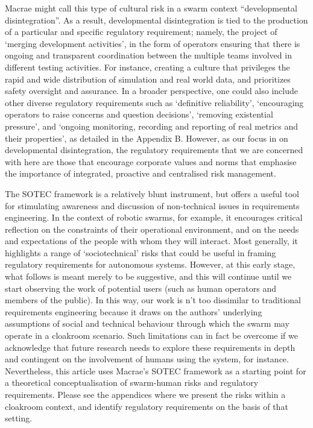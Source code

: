 \documentclass[lettersize,journal]{IEEEtran}
\begin{document}
Macrae \cite{macrae2021learning} might call this type of cultural risk in a swarm context ``developmental disintegration”. As a result, developmental disintegration is tied to the production of a particular and specific regulatory requirement; namely, the project of `merging development activities’, in the form of operators ensuring that there is ongoing and transparent coordination between the multiple teams involved in different testing activities. For instance, creating a culture that privileges the rapid and wide distribution of simulation and real world data, and prioritizes safety oversight and assurance. In a broader perspective, one could also include other diverse regulatory requirements such as `definitive reliability’, `encouraging operators to raise concerns and question decisions’, `removing existential pressure’, and `ongoing monitoring, recording and reporting of real metrics and their properties’, as detailed in the Appendix B. However, as our focus in on developmental disintegration, the regulatory requirements that we are concerned with here are those that encourage corporate values and norms that emphasise the importance of integrated, proactive and centralised risk management.

The SOTEC framework is a relatively blunt instrument, but offers a useful tool for stimulating awareness and discussion of non-technical issues in requirements engineering. In the context of robotic swarms, for example, it encourages critical reflection on the constraints of their operational environment, and on the needs and expectations of the people with whom they will interact. Most generally, it highlights a range of `sociotechnical’ risks that could be useful in framing regulatory requirements for autonomous systems. However, at this early stage, what follows is meant merely to be suggestive, and this will continue until we start observing the work of potential users (such as human operators and members of the public). In this way, our work is n’t too dissimilar to traditional requirements engineering because it draws on the authors’ underlying assumptions of social and technical behaviour through which the swarm may operate in a cloakroom scenario. Such limitations can in fact be overcome if we acknowledge that future research needs to explore these requirements in depth and contingent on the involvement of humans using the system, for instance. Nevertheless, this article uses Macrae’s SOTEC framework \cite{macrae2021learning} as a starting point for a theoretical conceptualisation of swarm-human risks and regulatory requirements. Please see the appendices where we present the risks within a cloakroom context, and identify regulatory requirements on the basis of that setting.
\end{document}
